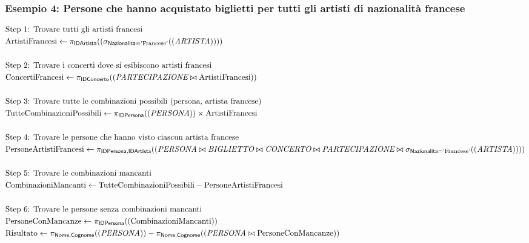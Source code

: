 	\subsubsection{Esempio 4: Persone che hanno acquistato biglietti per tutti gli artisti di nazionalità francese}
	
	\begin{align*}
		& \text{Step 1: Trovare tutti gli artisti francesi} \\
		& \text{ArtistiFrancesi} \leftarrow \pi_{\textsf{IDArtista}}((\sigma_{\textsf{Nazionalita} = \text{'Francese'}}((\textit{ARTISTA})))) \\
		& \\
		& \text{Step 2: Trovare i concerti dove si esibiscono artisti francesi} \\
		& \text{ConcertiFrancesi} \leftarrow \pi_{\textsf{IDConcerto}}((\textit{PARTECIPAZIONE} \bowtie \text{ArtistiFrancesi})) \\
		& \\
		& \text{Step 3: Trovare tutte le combinazioni possibili (persona, artista francese)} \\
		& \text{TutteCombinazioniPossibili} \leftarrow \pi_{\textsf{IDPersona}}((\textit{PERSONA})) \times \text{ArtistiFrancesi} \\
		& \\
		& \text{Step 4: Trovare le persone che hanno visto ciascun artista francese} \\
		& \text{PersoneArtistiFrancesi} \leftarrow \pi_{\textsf{IDPersona}, \textsf{IDArtista}}((
			\textit{PERSONA} \bowtie \textit{BIGLIETTO} \bowtie \textit{CONCERTO} \bowtie \textit{PARTECIPAZIONE} \bowtie \sigma_{\textsf{Nazionalita} = \text{'Francese'}}((\textit{ARTISTA}))
		)) \\
		& \\
		& \text{Step 5: Trovare le combinazioni mancanti} \\
		& \text{CombinazioniMancanti} \leftarrow \text{TutteCombinazioniPossibili} - \text{PersoneArtistiFrancesi} \\
		& \\
		& \text{Step 6: Trovare le persone senza combinazioni mancanti} \\
		& \text{PersoneConMancanze} \leftarrow \pi_{\textsf{IDPersona}}((\text{CombinazioniMancanti})) \\
		& \text{Risultato} \leftarrow \pi_{\textsf{Nome}, \textsf{Cognome}}((\textit{PERSONA})) - \pi_{\textsf{Nome}, \textsf{Cognome}}((\textit{PERSONA} \bowtie \text{PersoneConMancanze}))
	\end{align*}
	
